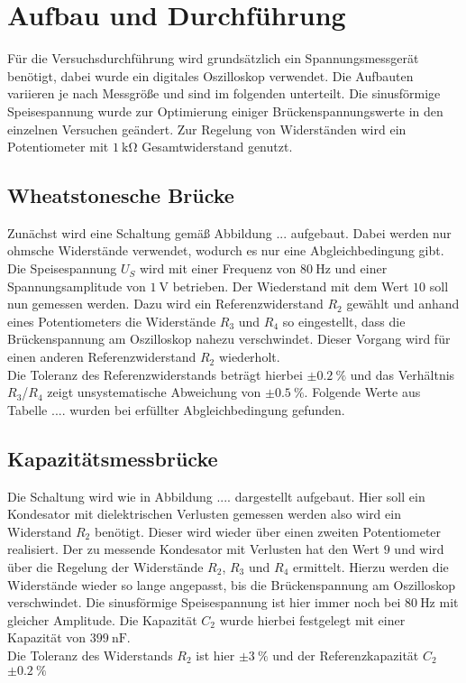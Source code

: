 \section{Aufbau und Durchführung}

Für die Versuchsdurchführung wird grundsätzlich ein Spannungsmessgerät benötigt, dabei wurde ein digitales Oszilloskop verwendet. Die Aufbauten variieren je nach Messgröße und sind
im folgenden unterteilt. Die sinusförmige Speisespannung wurde zur Optimierung einiger Brückenspannungswerte in den einzelnen Versuchen geändert. Zur Regelung von Widerständen wird ein Potentiometer mit $\SI{1}{\kilo\ohm}$ Gesamtwiderstand 
genutzt.

\subsection{Wheatstonesche Brücke}
Zunächst wird eine Schaltung gemäß Abbildung ... aufgebaut. Dabei werden nur ohmsche Widerstände verwendet, wodurch es nur eine Abgleichbedingung gibt. Die Speisespannung $U_{S}$ wird mit einer Frequenz von
$\SI{80}{\hertz}$ und einer Spannungsamplitude von $\SI{1}{\volt}$ betrieben. Der Wiederstand mit dem Wert $10$ soll nun gemessen werden. Dazu wird ein Referenzwiderstand $R_{2}$ gewählt und anhand eines Potentiometers die Widerstände 
$R_{3}$ und $R_{4}$ so eingestellt, dass die Brückenspannung am Oszilloskop nahezu verschwindet. Dieser Vorgang wird für einen anderen Referenzwiderstand $R_{2}$ wiederholt. 
\\
\newline
Die Toleranz des Referenzwiderstands beträgt hierbei $\pm\SI{0.2}{\percent}$ und das Verhältnis $R_{3}$/$R_{4}$ zeigt unsystematische Abweichung von $\pm\SI{0.5}{\percent}$.
Folgende Werte aus Tabelle .... wurden bei erfüllter Abgleichbedingung gefunden.

\subsection{Kapazitätsmessbrücke}
Die Schaltung wird wie in Abbildung .... dargestellt aufgebaut. Hier soll ein Kondesator mit dielektrischen Verlusten gemessen werden also wird ein Widerstand $R_{2}$ benötigt. Dieser wird wieder über einen
zweiten Potentiometer realisiert. Der zu messende Kondesator mit 
Verlusten hat den Wert $9$ und wird über die Regelung der Widerstände $R_{2}$, $R_{3}$ und $R_{4}$ ermittelt. Hierzu werden die Widerstände wieder so lange angepasst, bis die Brückenspannung am Oszilloskop verschwindet.
Die sinusförmige Speisespannung ist hier immer noch bei $\SI{80}{\hertz}$ mit gleicher Amplitude. Die Kapazität $C_{2}$ wurde hierbei festgelegt mit einer Kapazität von $\SI{399}{\nano\farad}$.
\\
\newline
Die Toleranz des Widerstands $R_{2}$ ist hier $\pm\SI{3}{\percent}$ und der Referenzkapazität $C_{2}$ $\pm\SI{0.2}{\percent}$

